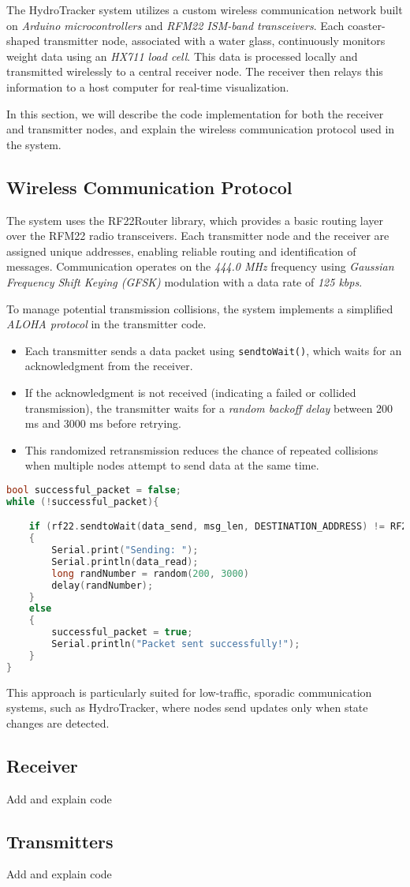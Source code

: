 The HydroTracker system utilizes a custom wireless communication network built on \textit{Arduino microcontrollers} and \textit{RFM22 ISM-band transceivers}. 
Each coaster-shaped transmitter node, associated with a water glass, continuously monitors weight data using an \textit{HX711 load cell}. 
This data is processed locally and transmitted wirelessly to a central receiver node. 
The receiver then relays this information to a host computer for real-time visualization.

In this section, we will describe the code implementation for both the receiver and transmitter nodes, and explain the wireless communication protocol used in the system.

\subsection{Wireless Communication Protocol}

The system uses the RF22Router library, which provides a basic routing layer over the RFM22 radio transceivers. 
Each transmitter node and the receiver are assigned unique addresses, enabling reliable routing and identification of messages. 
Communication operates on the \textit{444.0 MHz} frequency using \textit{Gaussian Frequency Shift Keying (GFSK)} modulation with a data rate of \textit{125 kbps}.

To manage potential transmission collisions, the system implements a simplified \textit{ALOHA protocol} in the transmitter code.

\begin{itemize}
    \item Each transmitter sends a data packet using \texttt{sendtoWait()}, which waits for an acknowledgment from the receiver.
    \item If the acknowledgment is not received (indicating a failed or collided transmission), the transmitter waits for a \textit{random backoff delay} between 200 ms and 3000 ms before retrying.
    \item This randomized retransmission reduces the chance of repeated collisions when multiple nodes attempt to send data at the same time.
\end{itemize}

\begin{lstlisting}[language=C++, caption={ALOHA protocol implementation in the transmitter}]
bool successful_packet = false;
while (!successful_packet){

    if (rf22.sendtoWait(data_send, msg_len, DESTINATION_ADDRESS) != RF22_ROUTER_ERROR_NONE)
    {
        Serial.print("Sending: ");
        Serial.println(data_read);
        long randNumber = random(200, 3000)
        delay(randNumber);
    }
    else
    {
        successful_packet = true;
        Serial.println("Packet sent successfully!");
    }
}
\end{lstlisting}

This approach is particularly suited for low-traffic, sporadic communication systems, such as HydroTracker, where nodes send updates only when state changes are detected. 

\subsection{Receiver}
Add and explain code 

\subsection{Transmitters}
Add and explain code